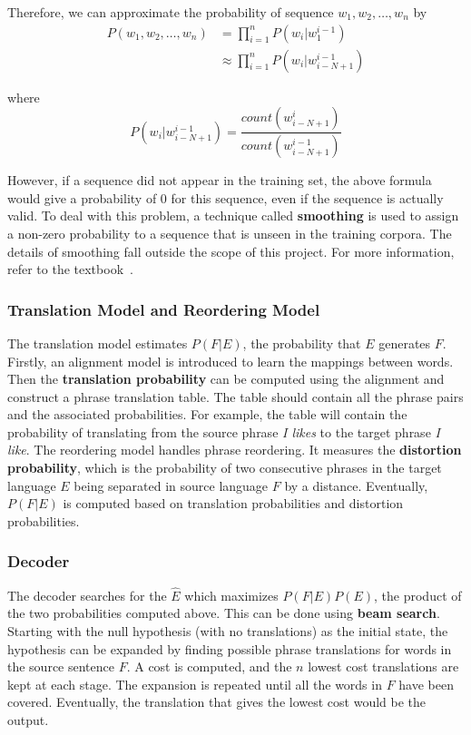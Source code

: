 \documentclass[12pt,a4paper,twoside]{report}
\begin{document}
Therefore, we can approximate the probability of sequence $w_1, w_2, \dots, w_n$ by
\begin{equation*}
\begin{split}
P(w_1, w_2, \dots, w_n) & = \prod_{i=1}^{n}P(w_i|w_1^{i-1})\\
 & \approx \prod_{i=1}^{n}P(w_i|w_{i-N+1}^{i-1})
\end{split}
\end{equation*}

where
\begin{equation*}
P(w_i|w_{i-N+1}^{i-1}) = \frac{count(w_{i-N+1}^i)}{count(w_{i-N+1}^{i-1})}
\end{equation*}

However, if a sequence did not appear in the training set, the above formula would give a probability of 0 for this sequence, even if the sequence is actually valid. To deal with this problem, a technique called \textbf{smoothing} is used to assign a non-zero probability to a sequence that is unseen in the training corpora. The details of smoothing fall outside the scope of this project. For more information, refer to the textbook~\cite{Jurafsky:2009:SLP:1214993}.

\subsubsection{Translation Model and Reordering Model}
The translation model estimates $P(F|E)$,  the probability that $E$ generates $F$. Firstly, an alignment model is introduced to learn the mappings between words. Then the \textbf{translation probability} can be computed using the alignment and construct a phrase translation table. The table should contain all the phrase pairs and the associated probabilities. For example, the table will contain the probability of translating from the source phrase \textit{I likes} to the target phrase \textit{I like}. The reordering model handles phrase reordering. It measures the \textbf{distortion probability}, which is the probability of two consecutive phrases in the target language $E$ being separated in source language $F$ by a distance. Eventually, $P(F|E)$ is computed based on translation probabilities and distortion probabilities.

\subsubsection{Decoder}
The decoder searches for the $\hat{E}$ which maximizes $P(F|E)P(E)$, the product of the two probabilities computed above. This can be done using \textbf{beam search}. Starting with the null hypothesis (with no translations) as the initial state, the hypothesis can be expanded by finding possible phrase translations for words in the source sentence $F$. A cost is computed, and the $n$ lowest cost translations are kept at each stage. The expansion is repeated until all the words in $F$ have been covered. Eventually, the translation that gives the lowest cost would be the output.
\end{document}
